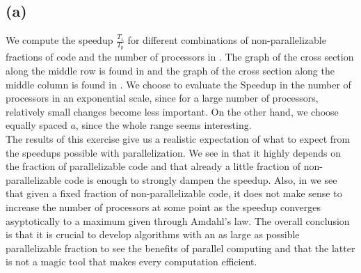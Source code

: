 \subsection*{(a)}
\FloatBarrier
We compute the speedup $\frac{T_1}{T_p}$ for different combinations of non-parallelizable fractions of code and the number of processors in . The graph of the cross section along the middle row is found in  and the graph of the cross section along the middle column is found in . We choose to evaluate the Speedup in the number of processors in an exponential scale, since for a large number of processors, relatively small changes become less important. On the other hand, we choose equally spaced $a$, since the whole range seems interesting.
\\

The results of this exercise give us a realistic expectation of what to expect from the speedups possible with parallelization. We see in  that it highly depends on the fraction of parallelizable code and that already a little fraction of non-parallelizable code is enough to strongly dampen the speedup. Also, in  we see that given a fixed fraction of non-parallelizable code, it does not make sense to increase the number of processors at some point as the speedup converges asyptotically to a maximum given through Amdahl's law. The overall conclusion is that it is crucial to develop algorithms with an as large as possible parallelizable fraction to see the benefits of parallel computing and that the latter is not a magic tool that makes every computation efficient.


